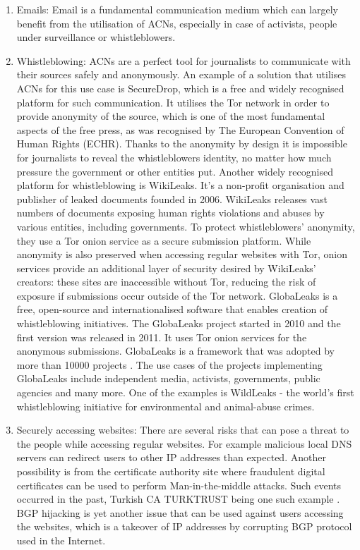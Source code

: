 \begin{enumerate}
    \item Emails: Email is a fundamental communication medium which can largely benefit from the utilisation of ACNs, especially in case of activists, people under surveillance or whistleblowers.
    \item Whistleblowing: ACNs are a perfect tool for journalists to communicate with their sources safely and anonymously. An example of a solution that utilises ACNs for this use case is SecureDrop, which is a free and widely recognised platform for such communication. It utilises the Tor network in order to provide anonymity of the source, which is one of the most fundamental aspects of the free press, as was recognised by The European Convention of Human Rights (ECHR). Thanks to the anonymity by design it is impossible for journalists to reveal the whistleblowers identity, no matter how much pressure the government or other entities put.
    Another widely recognised platform for whistleblowing is WikiLeaks. It’s a non-profit organisation and publisher of leaked documents founded in 2006. WikiLeaks releases vast numbers of documents exposing human rights violations and abuses by various entities, including governments. To protect whistleblowers’ anonymity, they use a Tor onion service as a secure submission platform. While anonymity is also preserved when accessing regular websites with Tor, onion services provide an additional layer of security desired by WikiLeaks’ creators: these sites are inaccessible without Tor, reducing the risk of exposure if submissions occur outside of the Tor network.
    GlobaLeaks is a free, open-source and internationalised software that enables creation of whistleblowing initiatives. The GlobaLeaks project started in 2010 and the first version was released in 2011. It uses Tor onion services for the anonymous submissions. GlobaLeaks is a framework that was adopted by more than 10000 projects \cite{globaleaks}. The use cases of the projects implementing GlobaLeaks include independent media, activists, governments, public agencies and many more. One of the examples is WildLeaks \cite{wildleaks} - the world’s first whistleblowing initiative for environmental and animal-abuse crimes.
    \item Securely accessing websites: There are several risks that can pose a threat to the people while accessing regular websites. For example malicious local DNS servers can redirect users to other IP addresses than expected. Another possibility is from the certificate authority site where fraudulent digital certificates can be used to perform Man-in-the-middle attacks. Such events occurred in the past, Turkish CA TURKTRUST being one such example \cite{turkish-ca}. BGP hijacking is yet another issue that can be used against users accessing the websites, which is a takeover of IP addresses by corrupting BGP protocol used in the Internet. 

\end{enumerate}
